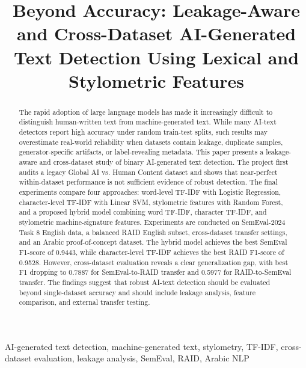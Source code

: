 \documentclass[conference]{IEEEtran}
\begin{document}
\title{Beyond Accuracy: Leakage-Aware and Cross-Dataset AI-Generated Text Detection Using Lexical and Stylometric Features}

\author{
}

\maketitle

\begin{abstract}
The rapid adoption of large language models has made it increasingly difficult to distinguish human-written text from machine-generated text. While many AI-text detectors report high accuracy under random train-test splits, such results may overestimate real-world reliability when datasets contain leakage, duplicate samples, generator-specific artifacts, or label-revealing metadata. This paper presents a leakage-aware and cross-dataset study of binary AI-generated text detection. The project first audits a legacy Global AI vs. Human Content dataset and shows that near-perfect within-dataset performance is not sufficient evidence of robust detection. The final experiments compare four approaches: word-level TF-IDF with Logistic Regression, character-level TF-IDF with Linear SVM, stylometric features with Random Forest, and a proposed hybrid model combining word TF-IDF, character TF-IDF, and stylometric machine-signature features. Experiments are conducted on SemEval-2024 Task 8 English data, a balanced RAID English subset, cross-dataset transfer settings, and an Arabic proof-of-concept dataset. The hybrid model achieves the best SemEval F1-score of 0.9443, while character-level TF-IDF achieves the best RAID F1-score of 0.9528. However, cross-dataset evaluation reveals a clear generalization gap, with best F1 dropping to 0.7887 for SemEval-to-RAID transfer and 0.5977 for RAID-to-SemEval transfer. The findings suggest that robust AI-text detection should be evaluated beyond single-dataset accuracy and should include leakage analysis, feature comparison, and external transfer testing.
\end{abstract}

\begin{IEEEkeywords}
AI-generated text detection, machine-generated text, stylometry, TF-IDF, cross-dataset evaluation, leakage analysis, SemEval, RAID, Arabic NLP
\end{IEEEkeywords}
\end{document}
